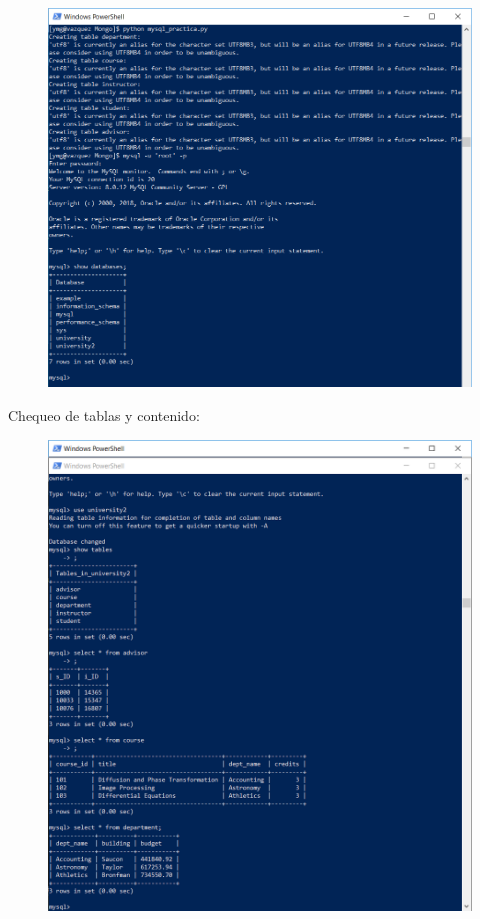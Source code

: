 \documentclass[]{article}
\begin{document}
\begin{figure}[htbp]
\centering
\includegraphics{ejec.png}
\end{figure}

Chequeo de tablas y contenido:

\begin{figure}[htbp]
\centering
\includegraphics{tablas1.png}
\end{figure}
\end{document}
